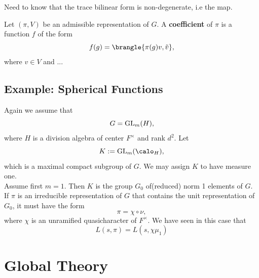 \documentclass[11pt, x11names, openany]{book}
\begin{document}
Need to know that the trace bilinear form is non-degenerate, i.e the map. 

\begin{defn}
\label{def: coefficient of repn}
Let $(\pi, V)$ be an admissible representation of $G$. A \textbf{coefficient} of $\pi$ is a function $f$ of the form 
\begin{equation*}
  f(g) = \brangle{\pi(g)v, \tilde{v}},
\end{equation*}
where $v \in V$ and ...
\end{defn}



\section{Example: Spherical Functions}
Again we assume that 
\begin{equation*}
  G = \operatorname{GL}_m(H),
\end{equation*}
where $H$ is a division algebra of center $F^\times$ and rank $d^2$. Let 
\begin{equation*}
  K := \GL_m(\calo_H),
\end{equation*}
which is a maximal compact subgroup of $G$. We may assign $K$ to have measure one.\\

Assume first $m = 1$. Then $K$ is the group $G_0$ of(reduced) norm 1 elements of $G$. If $\pi$ is an irreducible representation of $G$ that contains the unit representation of $G_0$, it must have the form 
\begin{equation*}
  \pi = \chi \circ \nu,
\end{equation*}
where $\chi$ is an unramified quasicharacter of $F^\times$. We have seen in this case that
\begin{equation*}
  L(s, \pi) = L(s, \chi \mu_1)
\end{equation*}


\chapter{Global Theory}
\end{document}
